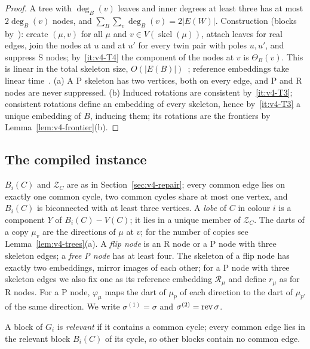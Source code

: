\begin{proof}
A tree with $\deg_B(v)$ leaves and inner degrees at least three has at most
$2\deg_B(v)$ nodes, and $\sum_B\sum_v\deg_B(v)=2|E(W)|$. Construction
(blocks by~\cite{Tar72}): create $(\mu,v)$ for all $\mu$ and $v\in
V(\operatorname{skel}(\mu))$, attach leaves for real edges, join the nodes at
$u$ and at $u'$ for every twin pair with poles $u,u'$, and suppress S nodes;
by~\ref{it:v4-T4} the component of the nodes at $v$ is $\Theta_B(v)$. This is linear in the total
skeleton size, $O(|E(B)|)$~\cite{HT73,GM01}; reference embeddings take
linear time~\cite{HT74}. (a) A P skeleton has two vertices, both on every
edge, and P and R nodes are never suppressed. (b) Induced rotations are
consistent by~\ref{it:v4-T3}; consistent rotations define an embedding of
every skeleton, hence by~\ref{it:v4-T3} a unique embedding of $B$, inducing
them; its rotations are the frontiers by Lemma~\ref{lem:v4-frontier}(b).
\end{proof}

\subsection{The compiled instance}\label{sec:v4-cmp-instance}

$B_i(C)$ and $\mathcal Z_C$ are as in Section~\ref{sec:v4-repair}; every
common edge lies on exactly one common cycle, two common cycles share at most
one vertex, and $B_i(C)$ is biconnected with at least three vertices. A
\emph{lobe} of $C$ in colour $i$ is a component $Y$ of $B_i(C)-V(C)$; it
lies in a unique member of $\mathcal Z_C$. The darts of a
copy $\mu_v$ are the directions of $\mu$ at $v$; for the number of copies
see Lemma~\ref{lem:v4-trees}(a). A \emph{flip node} is an R
node or a P node with three skeleton edges; a \emph{free P node} has at
least four. The skeleton of a flip node has exactly two embeddings, mirror
images of each other; for a P node with three skeleton edges we also fix one
as its reference embedding $\mathcal R_\mu$ and define $r_\mu$ as for R
nodes.
For a P node, $\varphi_\mu$ maps the dart of $\mu_p$ of each direction to
the dart of $\mu_{p'}$ of the same direction. We write $\sigma^{(1)}=\sigma$
and $\sigma^{(2)}=\operatorname{rev}\sigma$.

A block of $G_i$ is \emph{relevant} if it contains a common cycle; every
common edge lies in the relevant block $B_i(C)$ of its cycle, so other blocks
contain no common edge.

